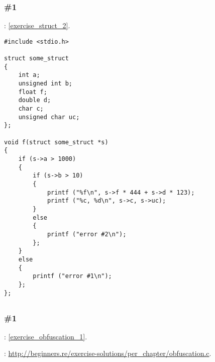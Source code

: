 \subsubsection{\Exercise \#1}
\label{exercise_solutions_struct_2}

\Exercise: \ref{exercise_struct_2}.


\begin{lstlisting}
#include <stdio.h>

struct some_struct
{
	int a;
	unsigned int b;
	float f;
	double d;
	char c;
	unsigned char uc;
};

void f(struct some_struct *s)
{
	if (s->a > 1000)
	{
		if (s->b > 10)
		{
			printf ("%f\n", s->f * 444 + s->d * 123);
			printf ("%c, %d\n", s->c, s->uc);
		}
		else
		{
			printf ("error #2\n");
		};
	}
	else
	{
		printf ("error #1\n");
	};
};
\end{lstlisting}

\subsection{}

\subsubsection{\Exercise \#1}
\label{exercise_solutions_obfuscation_1}

\Exercise: \ref{exercise_obfuscation_1}.

: \url{http://beginners.re/exercise-solutions/per_chapter/obfuscation.c}.
